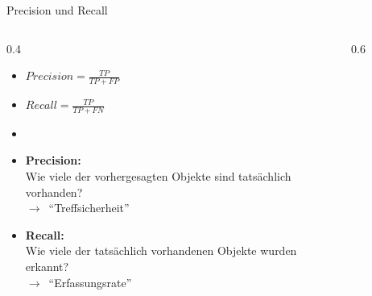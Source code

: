 \documentclass{beamer}
\begin{document}
\begin{frame}[shrink=8]{Precision und Recall}
  \begin{columns}
    \begin{column}{0.4\textwidth}
      \begin{itemize}
        \item \(Precision = \frac{TP}{TP + FP}\)
        \item \(Recall = \frac{TP}{TP + FN}\)
        \item[]

        \item<3->\textbf{Precision:}\\Wie viele der vorhergesagten Objekte sind tatsächlich vorhanden?\\\(\rightarrow\)~\enquote{Treffsicherheit}
        \item<4->\textbf{Recall:}\\Wie viele der tatsächlich vorhandenen Objekte wurden erkannt?\\\(\rightarrow\)~\enquote{Erfassungsrate}
      \end{itemize}
    \end{column}
    \begin{column}{0.6\textwidth}
      \begin{figure}
        \centering
      \end{figure}
    \end{column}
  \end{columns}
\end{frame}
\end{document}
